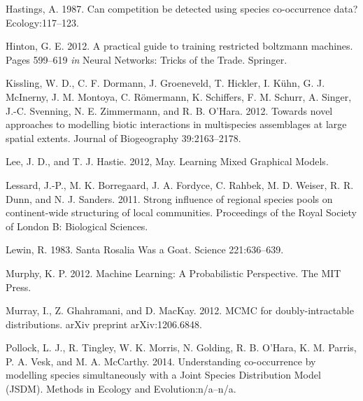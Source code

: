 \documentclass[12pt,]{article}
\begin{document}
\begin{spacing}{1.9}
\begin{flushleft}
Hastings, A. 1987. Can competition be detected using species
co-occurrence data? Ecology:117--123.

Hinton, G. E. 2012. A practical guide to training restricted boltzmann
machines. Pages 599--619 \emph{in} Neural Networks: Tricks of the Trade.
Springer.

Kissling, W. D., C. F. Dormann, J. Groeneveld, T. Hickler, I. Kühn, G.
J. McInerny, J. M. Montoya, C. Römermann, K. Schiffers, F. M. Schurr, A.
Singer, J.-C. Svenning, N. E. Zimmermann, and R. B. O'Hara. 2012.
Towards novel approaches to modelling biotic interactions in
multispecies assemblages at large spatial extents. Journal of
Biogeography 39:2163--2178.

Lee, J. D., and T. J. Hastie. 2012, May. Learning Mixed Graphical
Models.

Lessard, J.-P., M. K. Borregaard, J. A. Fordyce, C. Rahbek, M. D.
Weiser, R. R. Dunn, and N. J. Sanders. 2011. Strong influence of
regional species pools on continent-wide structuring of local
communities. Proceedings of the Royal Society of London B: Biological
Sciences.

Lewin, R. 1983. Santa Rosalia Was a Goat. Science 221:636--639.

Murphy, K. P. 2012. Machine Learning: A Probabilistic Perspective. The
MIT Press.

Murray, I., Z. Ghahramani, and D. MacKay. 2012. MCMC for
doubly-intractable distributions. arXiv preprint arXiv:1206.6848.

Pollock, L. J., R. Tingley, W. K. Morris, N. Golding, R. B. O'Hara, K.
M. Parris, P. A. Vesk, and M. A. McCarthy. 2014. Understanding
co-occurrence by modelling species simultaneously with a Joint Species
Distribution Model (JSDM). Methods in Ecology and Evolution:n/a--n/a.


\end{flushleft}
\end{spacing}
\end{document}
